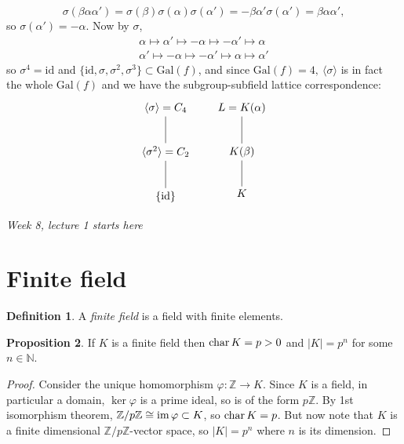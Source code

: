 \documentclass[a4paper]{article}
\newcommand{\Z}{\mathbb Z}
\newcommand{\gal}{\text{Gal}}
\newcommand{\Char}{\text{char\,}}
\newcommand{\id}{\text{id}}
\newcommand{\im}{\text{im\,}}
\theoremstyle{definition}
\newtheorem{defn}{Definition}[subsection]
\newtheorem{prop}[defn]{Proposition}
\begin{document}
\begin{enumerate}
\[
\sigma(\beta\alpha\alpha')=\sigma(\beta)\sigma(\alpha)\sigma(\alpha')=-\beta\alpha'\sigma(\alpha')=\beta\alpha\alpha',
\]
so $\sigma(\alpha')=-\alpha$. Now by $\sigma$,
\[
\begin{aligned}
\alpha\mapsto\alpha'\mapsto -\alpha\mapsto-\alpha'\mapsto\alpha \\
\alpha'\mapsto-\alpha\mapsto -\alpha'\mapsto\alpha\mapsto\alpha'
\end{aligned}
\]
so $\sigma^4=\id$ and $\{\id,\sigma,\sigma^2,\sigma^3\}\subset \gal(f)$,
and since $\gal(f)=4,\ \langle\sigma\rangle$ is in fact the whole $\gal(f)$ and we have the subgroup-subfield lattice correspondence:
\[
\xymatrix{
\langle\sigma\rangle = C_4\ar@{-}[d] \\
\langle\sigma^2\rangle = C_2\ar@{-}[d] \\
\{\id\}
} \qquad \xymatrix{
L=K(\alpha)\ar@{-}[d] \\
K(\beta)\ar@{-}[d] \\
K
}
\]
\end{enumerate}

\begin{flushright}
\textit{Week 8, lecture 1 starts here}
\end{flushright}

\section{Finite field}
\begin{defn}
A \textit{finite field} is a field with finite elements.
\end{defn}

\begin{prop}
If $K$ is a finite field then $\Char K=p>0$ and $|K|=p^n$ for some $n\in\mathbb N$.    
\end{prop}
\begin{proof}
Consider the unique homomorphism $\varphi:\Z\rightarrow K$. Since $K$ is a field, in particular a domain, $\ker\varphi$ is a prime ideal, so is of the form $p\Z$. By 1st isomorphism theorem, $\Z/p\Z\cong \im \varphi\subset K$, so $\Char K=p$. But now note that $K$ is a finite dimensional $\Z/p\Z$-vector space, so $|K|=p^n$ where $n$ is its dimension.
\end{proof}
\end{document}
